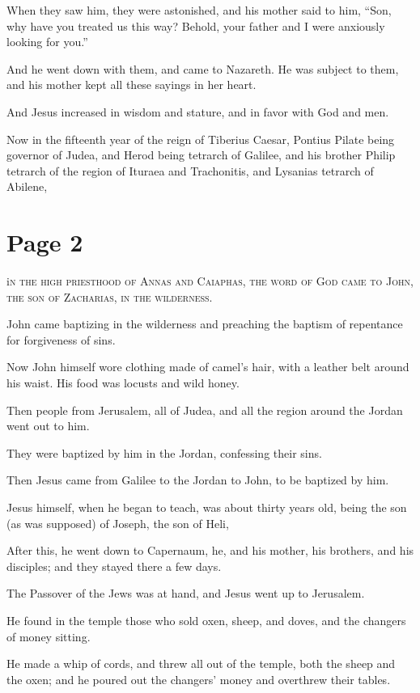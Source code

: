 When they saw him, they were astonished, and his mother said to him, “Son, why have you treated us this way? Behold, your father and I were anxiously looking for you.”

And he went down with them, and came to Nazareth. He was subject to them, and his mother kept all these sayings in her heart.

And Jesus increased in wisdom and stature, and in favor with God and men.

Now in the fifteenth year of the reign of Tiberius Caesar, Pontius Pilate being governor of Judea, and Herod being tetrarch of Galilee, and his brother Philip tetrarch of the region of Ituraea and Trachonitis, and Lysanias tetrarch of Abilene,



\chapterornament
\section*{Page 2}

\lettrine{i}{n the high priesthood of Annas and Caiaphas, the word of God came to John, the son of Zacharias, in the wilderness.}

John came baptizing in the wilderness and preaching the baptism of repentance for forgiveness of sins.

Now John himself wore clothing made of camel’s hair, with a leather belt around his waist. His food was locusts and wild honey.

Then people from Jerusalem, all of Judea, and all the region around the Jordan went out to him.

They were baptized by him in the Jordan, confessing their sins.

Then Jesus came from Galilee to the Jordan to John, to be baptized by him.

Jesus himself, when he began to teach, was about thirty years old, being the son (as was supposed) of Joseph, the son of Heli,

After this, he went down to Capernaum, he, and his mother, his brothers, and his disciples; and they stayed there a few days.

The Passover of the Jews was at hand, and Jesus went up to Jerusalem.

He found in the temple those who sold oxen, sheep, and doves, and the changers of money sitting.

He made a whip of cords, and threw all out of the temple, both the sheep and the oxen; and he poured out the changers’ money and overthrew their tables.

